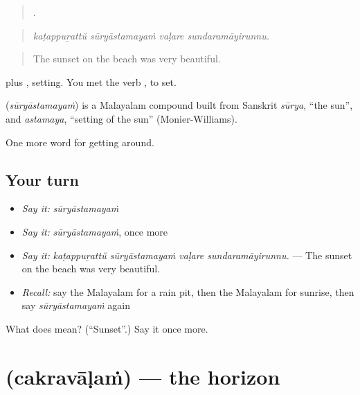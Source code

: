 \begin{quote}
   .
\end{quote}

\begin{quote}
\emph{kaṭappuṟattŭ sūryāstamayaṁ vaḷare sundaramāyirunnu.}
\end{quote}

\begin{quote}
The sunset on the beach was very beautiful.
\end{quote}

 plus , setting. You met the verb , to set.

\begin{cousinweb}
\textbf{} (\emph{sūryāstamayaṁ}) is a Malayalam compound built from Sanskrit \emph{sūrya}, \textquotedblleft{}the sun\textquotedblright{}, and \emph{astamaya}, \textquotedblleft{}setting of the sun\textquotedblright{} (Monier-Williams).
\end{cousinweb}

\begin{grammarlens}[title={What you've built}]
One more word for getting around.
\end{grammarlens}

\subsection*{Your turn}
\begin{itemize}
\raggedright
  \item \emph{Say it:} \emph{sūryāstamayaṁ}
  \item \emph{Say it:} \emph{sūryāstamayaṁ}, once more
  \item \emph{Say it:} \emph{kaṭappuṟattŭ sūryāstamayaṁ vaḷare sundaramāyirunnu.} — The sunset on the beach was very beautiful.
  \item \emph{Recall:} say the Malayalam for a rain pit, then the Malayalam for sunrise, then say \emph{sūryāstamayaṁ} again
\end{itemize}

\begin{tcolorbox}[breakable,colback=teal!4,colframe=teal!35!black,title={Before you move on}]
What does  mean? (\textquotedblleft{}Sunset\textquotedblright{}.) Say it once more.
\end{tcolorbox}
\section[\texorpdfstring{\ml{ചക്രവാളം} (cakravāḷaṁ)}{ചക്രവാളം (cakravāḷaṁ)}]{ (cakravāḷaṁ) — the horizon}

